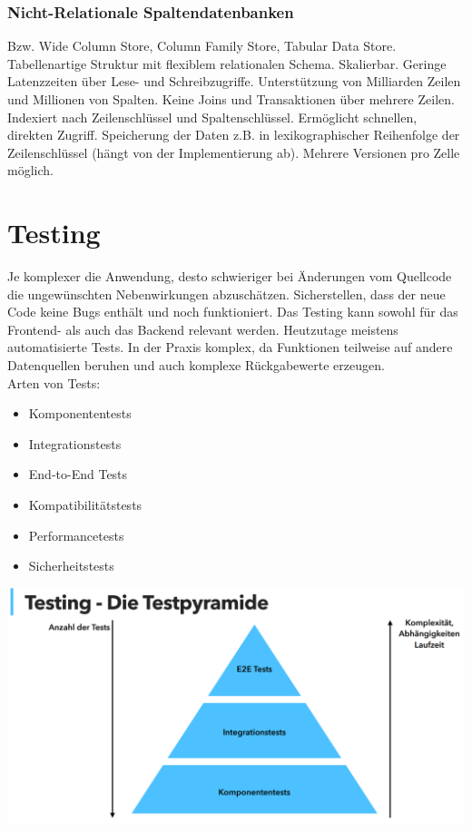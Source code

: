 \documentclass[12pt,a4paper]{article}
\begin{document}
\subsubsection{Nicht-Relationale Spaltendatenbanken}
Bzw. Wide Column Store, Column Family Store, Tabular Data Store. Tabellenartige Struktur mit flexiblem relationalen Schema. Skalierbar. Geringe Latenzzeiten über Lese- und Schreibzugriffe. Unterstützung von Milliarden Zeilen und Millionen von Spalten. Keine Joins und Transaktionen über mehrere Zeilen. Indexiert nach Zeilenschlüssel und Spaltenschlüssel. Ermöglicht schnellen, direkten Zugriff. Speicherung der Daten z.B. in lexikographischer Reihenfolge der Zeilenschlüssel (hängt von der Implementierung ab). Mehrere Versionen pro Zelle möglich. 

\section{Testing}
Je komplexer die Anwendung, desto schwieriger bei Änderungen vom Quellcode die
ungewünschten Nebenwirkungen abzuschätzen. Sicherstellen, dass der neue Code keine Bugs enthält und noch funktioniert. Das Testing kann sowohl für das Frontend- als auch das Backend relevant werden. Heutzutage meistens automatisierte Tests. In der Praxis komplex, da Funktionen teilweise auf andere Datenquellen beruhen und auch komplexe Rückgabewerte erzeugen.\\
Arten von Tests:
\begin{itemize}
	\item Komponententests
	\item Integrationstests
	\item End-to-End Tests
	\item Kompatibilitätstests
	\item Performancetests
	\item Sicherheitstests
\end{itemize}
\includegraphics[width=\textwidth]{Bilder/testpyramide.PNG}
\end{document}
